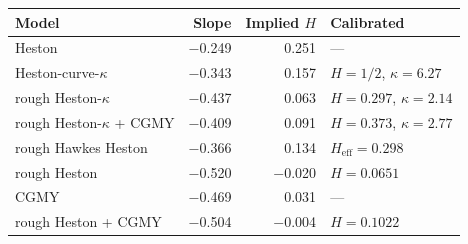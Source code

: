 \begin{tabular}{lrrl}
\toprule
Model & Slope & Implied $H$ & Calibrated\\
\midrule
Heston & $-$0.249 & 0.251 & ---\\
Heston-curve-$\kappa$ & $-$0.343 & 0.157 & $H = 1/2$, $\kappa = 6.27$\\
rough Heston-$\kappa$ & $-$0.437 & 0.063 & $H = 0.297$, $\kappa = 2.14$\\
rough Heston-$\kappa$ + CGMY & $-$0.409 & 0.091 & $H = 0.373$, $\kappa = 2.77$\\
rough Hawkes Heston & $-$0.366 & 0.134 & $H_{\mathrm{eff}} = 0.298$\\
\midrule
rough Heston & $-$0.520 & $-$0.020 & $H = 0.0651$\\
CGMY & $-$0.469 & 0.031 & ---\\
rough Heston + CGMY & $-$0.504 & $-$0.004 & $H = 0.1022$\\
\bottomrule
\end{tabular}
